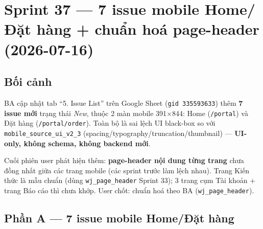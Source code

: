 \chapter{Sprint 37 --- 7 issue mobile Home/Đặt hàng + chuẩn hoá page-header (2026-07-16)}

\section{Bối cảnh}

BA cập nhật tab ``5. Issue List'' trên Google Sheet (\texttt{gid 335593633}) thêm \textbf{7 issue mới}
trạng thái \emph{New}, thuộc 2 màn mobile 391$\times$844: Home (\texttt{/portal}) và Đặt hàng
(\texttt{/portal/order}). Toàn bộ là sai lệch UI black-box so với \texttt{mobile\_source\_ui\_v2\_3}
(spacing/typography/truncation/thumbnail) --- \textbf{UI-only, không schema, không backend mới}.

Cuối phiên user phát hiện thêm: \textbf{page-header nội dung từng trang} chưa đồng nhất giữa các trang
mobile (các sprint trước làm lệch nhau). Trang Kiến thức là mẫu chuẩn (dùng \texttt{wj\_page\_header}
Sprint 33); 3 trang cụm Tài khoản + trang Báo cáo thì chưa khớp. User chốt: chuẩn hoá theo BA
(\texttt{wj\_page\_header}).

\section{Phần A --- 7 issue mobile Home/Đặt hàng}

